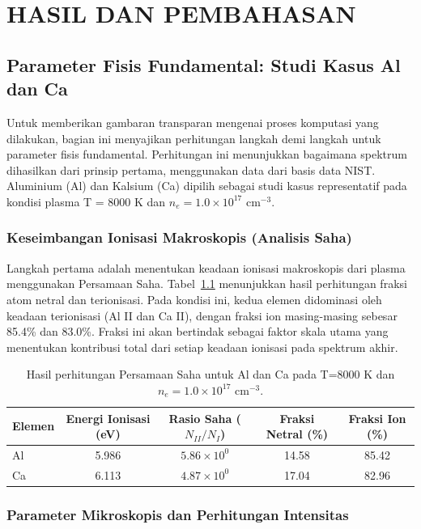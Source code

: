 \chapter{HASIL DAN PEMBAHASAN}
\label{ch:hasil_pembahasan}
\section{Parameter Fisis Fundamental: Studi Kasus Al dan Ca}
\label{sec:parameter_fisis}
Untuk memberikan gambaran transparan mengenai proses komputasi yang dilakukan, bagian ini menyajikan perhitungan langkah demi langkah untuk parameter fisis fundamental. Perhitungan ini menunjukkan bagaimana spektrum dihasilkan dari prinsip pertama, menggunakan data dari basis data NIST. Aluminium (Al) dan Kalsium (Ca) dipilih sebagai studi kasus representatif pada kondisi plasma T = 8000 K dan $n_e = 1.0 \times 10^{17}$ cm$^{-3}$.
\subsection{Keseimbangan Ionisasi Makroskopis (Analisis Saha)}

Langkah pertama adalah menentukan keadaan ionisasi makroskopis dari plasma menggunakan Persamaan Saha. Tabel~\ref{tab:saha_results} menunjukkan hasil perhitungan fraksi atom netral dan terionisasi. Pada kondisi ini, kedua elemen didominasi oleh keadaan terionisasi (Al II dan Ca II), dengan fraksi ion masing-masing sebesar 85.4\% dan 83.0\%. Fraksi ini akan bertindak sebagai faktor skala utama yang menentukan kontribusi total dari setiap keadaan ionisasi pada spektrum akhir.

\begin{table}[H]
    \centering
    \caption{Hasil perhitungan Persamaan Saha untuk Al dan Ca pada T=8000 K dan $n_e=1.0 \times 10^{17}$ cm$^{-3}$.}
    \label{tab:saha_results}
    \small
    \begin{tabular}{lcccc}
        \toprule
        \textbf{Elemen} & \textbf{Energi Ionisasi (eV)} & \textbf{Rasio Saha ($N_{II}/N_{I}$)} & \textbf{Fraksi Netral (\%)} & \textbf{Fraksi Ion (\%)} \\
        \midrule
        Al & 5.986 & $5.86 \times 10^0$ & 14.58 & 85.42 \\
        Ca & 6.113 & $4.87 \times 10^0$ & 17.04 & 82.96 \\
        \bottomrule
    \end{tabular}
\end{table}
\subsection{Parameter Mikroskopis dan Perhitungan Intensitas}

